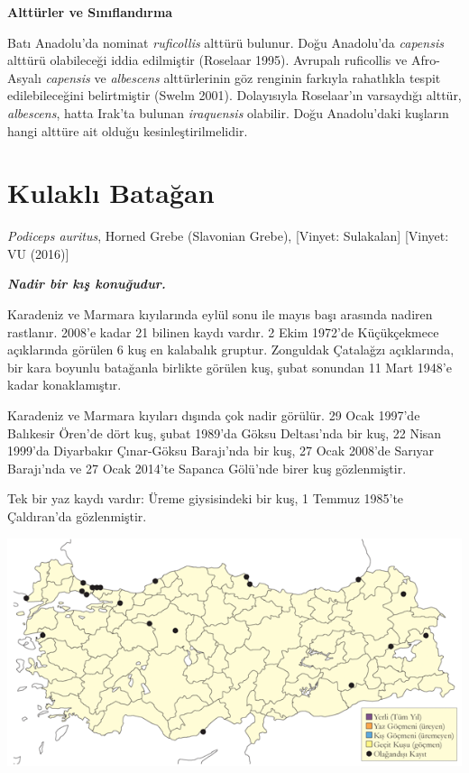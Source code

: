 \documentclass[
  letterpaper,
  DIV=11,
  numbers=noendperiod]{scrreprt}
\begin{document}
\textbf{Alttürler ve Sınıflandırma}

Batı Anadolu'da nominat \emph{ruficollis} alttürü bulunur. Doğu
Anadolu'da \emph{capensis} alttürü olabileceği iddia edilmiştir
(Roselaar 1995). Avrupalı ruficollis ve Afro-Asyalı \emph{capensis} ve
\emph{albescens} alttürlerinin göz renginin farkıyla rahatlıkla tespit
edilebileceğini belirtmiştir (Swelm 2001). Dolayısıyla Roselaar'ın
varsaydığı alttür, \emph{albescens}, hatta Irak'ta bulunan
\emph{iraquensis} olabilir. Doğu Anadolu'daki kuşların hangi alttüre ait
olduğu kesinleştirilmelidir.

\section{Kulaklı Batağan}\label{kulaklux131-bataux11fan}

\emph{Podiceps auritus}, Horned Grebe (Slavonian Grebe), {[}Vinyet:
Sulakalan{]} {[}Vinyet: VU (2016){]}

\textbf{\emph{Nadir bir kış konuğudur.}}

Karadeniz ve Marmara kıyılarında eylül sonu ile mayıs başı arasında
nadiren rastlanır. 2008'e kadar 21 bilinen kaydı vardır. 2 Ekim 1972'de
Küçükçekmece açıklarında görülen 6 kuş en kalabalık gruptur. Zonguldak
Çatalağzı açıklarında, bir kara boyunlu batağanla birlikte görülen kuş,
şubat sonundan 11 Mart 1948'e kadar konaklamıştır.

Karadeniz ve Marmara kıyıları dışında çok nadir görülür. 29 Ocak 1997'de
Balıkesir Ören'de dört kuş, şubat 1989'da Göksu Deltası'nda bir kuş, 22
Nisan 1999'da Diyarbakır Çınar-Göksu Barajı'nda bir kuş, 27 Ocak 2008'de
Sarıyar Barajı'nda ve 27 Ocak 2014'te Sapanca Gölü'nde birer kuş
gözlenmiştir.

Tek bir yaz kaydı vardır: Üreme giysisindeki bir kuş, 1 Temmuz 1985'te
Çaldıran'da gözlenmiştir.

\includegraphics{images/harita_Page_054.png}
\end{document}
